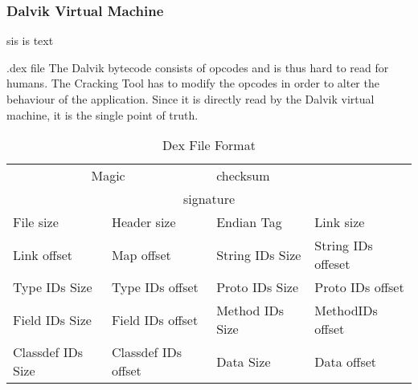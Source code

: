 \subsubsection{Dalvik Virtual Machine} \label{subsubsection:android-evolution-dvm}
sis is text



.dex file
The Dalvik bytecode consists of opcodes and is thus hard to read for humans. The Cracking Tool has to modify the opcodes in order to alter the behaviour of the application. Since it is directly read by the Dalvik virtual machine, it is the single point of truth.\newline

\begin{table}[]
\centering
\caption{Dex File Format}
\label{table:foundation-forensic-dex}
\begin{tabular}{|l|l|l|l}
\hline
\multicolumn{2}{|c|}{Magic}             & checksum        & \multicolumn{1}{c|}{}                   \\ \cline{1-3}
\multicolumn{4}{|c|}{signature}                                                                     \\ \hline
File size         & Header size         & Endian Tag      & \multicolumn{1}{l|}{Link size}          \\ \hline
Link offset       & Map offset          & String IDs Size & \multicolumn{1}{l|}{String IDs offeset} \\ \hline
Type IDs Size     & Type IDs offset     & Proto IDs Size  & \multicolumn{1}{l|}{Proto IDs offset}   \\ \hline
Field IDs Size    & Field IDs offset    & Method IDs Size & \multicolumn{1}{l|}{MethodIDs offset}   \\ \hline
Classdef IDs Size & Classdef IDs offset & Data Size       & \multicolumn{1}{l|}{Data offset}        \\ \hline
\end{tabular}
\end{table}
